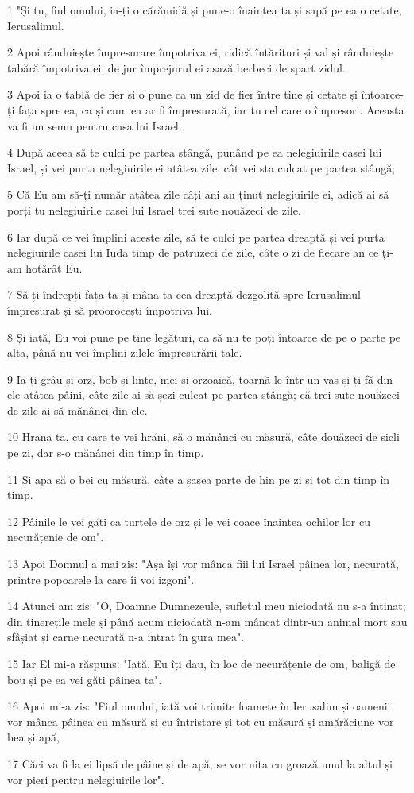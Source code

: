 \par 1 "Și tu, fiul omului, ia-ți o cărămidă și pune-o înaintea ta și sapă pe ea o cetate, Ierusalimul.
\par 2 Apoi rânduiește împresurare împotriva ei, ridică întărituri și val și rânduiește tabără împotriva ei; de jur împrejurul ei așază berbeci de spart zidul.
\par 3 Apoi ia o tablă de fier și o pune ca un zid de fier între tine și cetate și întoarce-ți fața spre ea, ca și cum ea ar fi împresurată, iar tu cel care o împresori. Aceasta va fi un semn pentru casa lui Israel.
\par 4 După aceea să te culci pe partea stângă, punând pe ea nelegiuirile casei lui Israel, și vei purta nelegiuirile ei atâtea zile, cât vei sta culcat pe partea stângă;
\par 5 Că Eu am să-ți număr atâtea zile câți ani au ținut nelegiuirile ei, adică ai să porți tu nelegiuirile casei lui Israel trei sute nouăzeci de zile.
\par 6 Iar după ce vei împlini aceste zile, să te culci pe partea dreaptă și vei purta nelegiuirile casei lui Iuda timp de patruzeci de zile, câte o zi de fiecare an ce ți-am hotărât Eu.
\par 7 Să-ți îndrepți fața ta și mâna ta cea dreaptă dezgolită spre Ierusalimul împresurat și să proorocești împotriva lui.
\par 8 Și iată, Eu voi pune pe tine legături, ca să nu te poți întoarce de pe o parte pe alta, până nu vei împlini zilele împresurării tale.
\par 9 Ia-ți grâu și orz, bob și linte, mei și orzoaică, toarnă-le într-un vas și-ți fă din ele atâtea pâini, câte zile ai să șezi culcat pe partea stângă; că trei sute nouăzeci de zile ai să mănânci din ele.
\par 10 Hrana ta, cu care te vei hrăni, să o mănânci cu măsură, câte douăzeci de sicli pe zi, dar s-o mănânci din timp în timp.
\par 11 Și apa să o bei cu măsură, câte a șasea parte de hin pe zi și tot din timp în timp.
\par 12 Pâinile le vei găti ca turtele de orz și le vei coace înaintea ochilor lor cu necurățenie de om".
\par 13 Apoi Domnul a mai zis: "Așa își vor mânca fiii lui Israel pâinea lor, necurată, printre popoarele la care îi voi izgoni".
\par 14 Atunci am zis: "O, Doamne Dumnezeule, sufletul meu niciodată nu s-a întinat; din tinerețile mele și până acum niciodată n-am mâncat dintr-un animal mort sau sfâșiat și carne necurată n-a intrat în gura mea".
\par 15 Iar El mi-a răspuns: "Iată, Eu îți dau, în loc de necurățenie de om, baligă de bou și pe ea vei găti pâinea ta".
\par 16 Apoi mi-a zis: "Fiul omului, iată voi trimite foamete în Ierusalim și oamenii vor mânca pâinea cu măsură și cu întristare și tot cu măsură și amărăciune vor bea și apă,
\par 17 Căci va fi la ei lipsă de pâine și de apă; se vor uita cu groază unul la altul și vor pieri pentru nelegiuirile lor".

